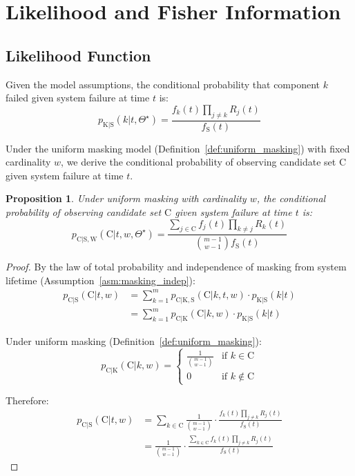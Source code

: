 \documentclass[12pt]{article}
\newcommand{\RV}[1]{\mathrm{#1}}
\newcommand{\sv}{\RV{S}}           %
\newcommand{\cand}{\RV{C}}         %
\newcommand{\rvcand}{\RV{C}}       %
\newcommand{\sysparam}{\Theta}
\newcommand{\tparam}[1]{{#1}^{\star}}  %
\newcommand{\pdf}{f}
\newcommand{\pmf}{p}
\newcommand{\srv}{R}
\newcommand{\spdf}{\pdf_{\sv}}
\newtheorem{proposition}[theorem]{Proposition}
\theoremstyle{definition}
\theoremstyle{remark}
\begin{document}
\section{Likelihood and Fisher Information}
\label{sec:general_fim}

\subsection{Likelihood Function}

Given the model assumptions, the conditional probability that component $k$ failed given system failure at time $t$ is:
\begin{equation}
\label{eq:component_failure_prob}
\pmf_{\RV{K} | \sv}(k | t, \tparam{\sysparam}) = \frac{\pdf_k(t) \prod_{j \neq k} \srv_j(t)}{\spdf(t)}
\end{equation}

Under the uniform masking model (Definition~\ref{def:uniform_masking}) with fixed cardinality $w$, we derive the conditional probability of observing candidate set $\cand$ given system failure at time $t$.

\begin{proposition}
\label{prop:candidate_prob}
Under uniform masking with cardinality $w$, the conditional probability of observing candidate set $\cand$ given system failure at time $t$ is:
\begin{equation}
\label{eq:candidate_prob}
\pmf_{\rvcand | \sv, \RV{W}}(\cand | t, w, \tparam{\sysparam}) = \frac{\sum_{j \in \cand} \pdf_j(t) \prod_{k \neq j} \srv_k(t)}{\binom{m-1}{w-1} \spdf(t)}
\end{equation}
\end{proposition}

\begin{proof}
By the law of total probability and independence of masking from system lifetime (Assumption~\ref{asm:masking_indep}):
\begin{align}
\pmf_{\rvcand | \sv}(\cand | t, w) &= \sum_{k=1}^{m} \pmf_{\rvcand | \RV{K}, \sv}(\cand | k, t, w) \cdot \pmf_{\RV{K} | \sv}(k | t) \nonumber\\
&= \sum_{k=1}^{m} \pmf_{\rvcand | \RV{K}}(\cand | k, w) \cdot \pmf_{\RV{K} | \sv}(k | t)
\end{align}

Under uniform masking (Definition~\ref{def:uniform_masking}):
\begin{equation}
\pmf_{\rvcand | \RV{K}}(\cand | k, w) = \begin{cases}
\frac{1}{\binom{m-1}{w-1}} & \text{if } k \in \cand \\
0 & \text{if } k \notin \cand
\end{cases}
\end{equation}

Therefore:
\begin{align}
\pmf_{\rvcand | \sv}(\cand | t, w) &= \sum_{k \in \cand} \frac{1}{\binom{m-1}{w-1}} \cdot \frac{\pdf_k(t) \prod_{j \neq k} \srv_j(t)}{\spdf(t)} \nonumber\\
&= \frac{1}{\binom{m-1}{w-1}} \cdot \frac{\sum_{k \in \cand} \pdf_k(t) \prod_{j \neq k} \srv_j(t)}{\spdf(t)}
\end{align}
\end{proof}
\end{document}
